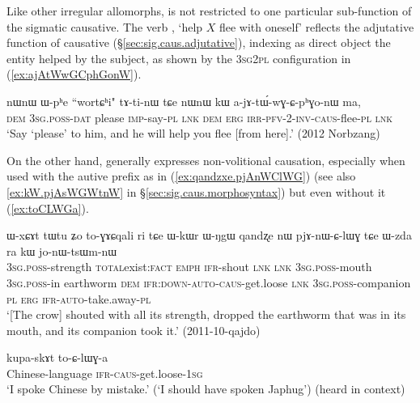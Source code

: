 Like other irregular allomorphs,  is not restricted to one particular sub-func\-tion of the sigmatic causative. The verb , `help $X$ flee with oneself' reflects the adjutative function of causative (§\ref{sec:sig.caus.adjutative}), indexing as direct object the entity helped by the subject, as shown by the \textsc{3sg}\fl{}\textsc{2pl} configuration in (\ref{ex:ajAtWwGCphGonW}).

\begin{exe}
\ex \label{ex:ajAtWwGCphGonW}
\gll nɯnɯ ɯ-pʰe ``wortɕʰi" tɤ-ti-nɯ tɕe nɯnɯ kɯ a-jɤ-tɯ́-wɣ-ɕ-pʰɣo-nɯ ma, \\
\textsc{dem} \textsc{3sg}.\textsc{poss}-\textsc{dat} please \textsc{imp}-say-\textsc{pl} \textsc{lnk} \textsc{dem} \textsc{erg} \textsc{irr}-\textsc{pfv}-2-\textsc{inv}-\textsc{caus}-flee-\textsc{pl} \textsc{lnk} \\
\glt `Say `please' to him, and he will help you flee [from here].' (2012 Norbzang)
\end{exe}

On the other hand,  generally expresses non-volitional causation, especially when used with the autive prefix as in (\ref{ex:qandzxe.pjAnWClWG}) (see also \ref{ex:kW.pjAsWGWtnW} in §\ref{sec:sig.caus.morphosyntax}) but even without it (\ref{ex:toCLWGa}).

\begin{exe}
\ex \label{ex:qandzxe.pjAnWClWG}
\gll ɯ-xɕɤt tɯ\redp{}tu ʑo to-ɣɤɕqali ri tɕe ɯ-kɯr ɯ-ŋgɯ qandʐe nɯ pjɤ-nɯ-ɕ-lɯɣ tɕe ɯ-zda ra kɯ jo-nɯ-tsɯm-nɯ \\
\textsc{3sg}.\textsc{poss}-strength \textsc{total}\redp{}exist:\textsc{fact} \textsc{emph} \textsc{ifr}-shout \textsc{lnk} \textsc{lnk} \textsc{3sg}.\textsc{poss}-mouth \textsc{3sg}.\textsc{poss}-in earthworm \textsc{dem} \textsc{ifr}:\textsc{down}-\textsc{auto}-\textsc{caus}-get.loose \textsc{lnk} \textsc{3sg}.\textsc{poss}-companion \textsc{pl} \textsc{erg} \textsc{ifr}-\textsc{auto}-take.away-\textsc{pl} \\
\glt `[The crow] shouted with all its strength, dropped the earthworm that was in its mouth, and its companion took it.' (2011-10-qajdo)
\end{exe}

\begin{exe}
\ex \label{ex:toCLWGa}
\gll kupa-skɤt to-ɕ-lɯɣ-a \\
Chinese-language \textsc{ifr}-\textsc{caus}-get.loose-\textsc{1sg} \\
\glt `I spoke Chinese by mistake.' (`I should have spoken Japhug') (heard in context)
\end{exe}


